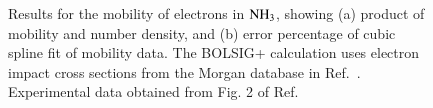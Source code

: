 \documentclass{warpdoc}
\let\citen\cite
\begin{document}
%
\begin{figure}
\centering
{}
\caption{Results for the mobility of electrons in ${\rm NH_3}$, showing (a) product of mobility and number density, and (b) error percentage of cubic spline fit of  mobility data. The BOLSIG+ calculation uses electron impact cross sections from the Morgan database in Ref.\ \citen{jcp:2012:morgan}. Experimental data obtained from Fig. 2 of Ref.\ \citen{jopd:2005:lisovskiy}}
\label{fig:mobility_NH3}
\end{figure}
\end{document}
